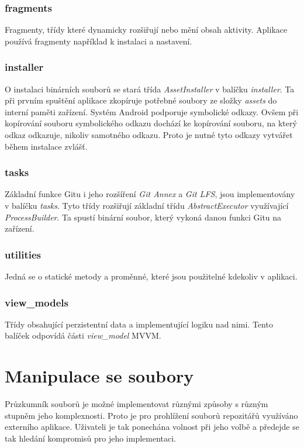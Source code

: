         \subsubsection{fragments}
        Fragmenty, třídy které dynamicky rozšiřují nebo mění obsah aktivity. Aplikace používá fragmenty například k instalaci a nastavení.

        \subsubsection{installer}
        O instalaci binárních souborů se stará třída \emph{AssetInstaller} v balíčku \emph{installer}. Ta při prvním spuštění aplikace zkopíruje potřebné soubory ze složky \emph{assets} do interní paměti zařízení. Systém Android podporuje symbolické odkazy. Ovšem při kopírování souboru symbolického odkazu dochází ke kopírování souboru, na který odkaz odkazuje, nikoliv samotného odkazu. Proto je nutné tyto odkazy vytvářet během instalace zvlášť.

        \subsubsection{tasks}
        Základní funkce Gitu i jeho rozšíření \emph{Git Annex} a \emph{Git LFS}, jsou implementovány v balíčku \emph{tasks}. Tyto třídy rozšiřují základní třídu \emph{AbstractExecutor} využívající \emph{ProcessBuilder}. Ta spustí binární soubor, který vykoná danou funkci Gitu na zařízení.

        \subsubsection{utilities}
        Jedná se o statické metody a proměnné, které jsou použitelné kdekoliv v aplikaci. 

        \subsubsection{view\_models}
        Třídy obsahující perzistentní data a implementující logiku nad nimi. Tento balíček odpovídá části \emph{view\_model} MVVM.

    \newpage
    \section{Manipulace se soubory}
    Průzkumník souborů je možné implementovat různými způsoby s různým stupněm jeho komplexnosti. Proto je pro prohlížení souborů repozitářů využíváno externího aplikace. Uživateli je tak ponechána volnost při jeho volbě a předejde se tak hledání kompromisů pro jeho implementaci.

